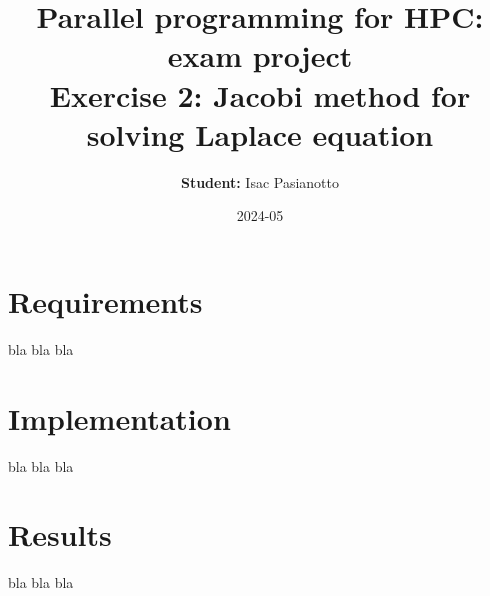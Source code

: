 \documentclass{article}
\title{Parallel programming for HPC: exam project\\ Exercise 2: Jacobi method for solving Laplace equation}
\author{\textbf{Student:} Isac Pasianotto}
\date{2024-05}
\begin{document}
    \maketitle

    \section{Requirements}

    bla bla bla

   \section{Implementation}

    bla bla bla

    \section{Results}

    bla bla bla

    
\end{document}
